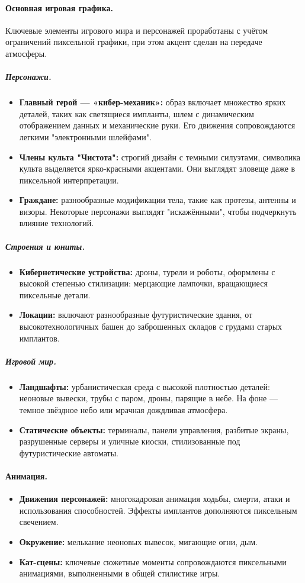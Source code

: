 \documentclass{article}
\begin{document}
\begin{itemize}
\paragraph{Основная игровая графика.}
Ключевые элементы игрового мира и персонажей проработаны с учётом ограничений пиксельной графики, при этом акцент сделан на передаче атмосферы.

\subparagraph{Персонажи.}
\begin{itemize}
    \item \textbf{Главный герой — «кибер-механик»:} образ включает множество ярких деталей, таких как светящиеся импланты, шлем с динамическим отображением данных и механические руки. Его движения сопровождаются легкими "электронными шлейфами".
    \item \textbf{Члены культа "Чистота":} строгий дизайн с темными силуэтами, символика культа выделяется ярко-красными акцентами. Они выглядят зловеще даже в пиксельной интерпретации.
    \item \textbf{Граждане:} разнообразные модификации тела, такие как протезы, антенны и визоры. Некоторые персонажи выглядят "искажёнными", чтобы подчеркнуть влияние технологий.
\end{itemize}

\subparagraph{Строения и юниты.}
\begin{itemize}
    \item \textbf{Кибернетические устройства:} дроны, турели и роботы, оформлены с высокой степенью стилизации: мерцающие лампочки, вращающиеся пиксельные детали.
    \item \textbf{Локации:} включают разнообразные футуристические здания, от высокотехнологичных башен до заброшенных складов с грудами старых имплантов.
\end{itemize}

\subparagraph{Игровой мир.}
\begin{itemize}
    \item \textbf{Ландшафты:} урбанистическая среда с высокой плотностью деталей: неоновые вывески, трубы с паром, дроны, парящие в небе. На фоне — темное звёздное небо или мрачная дождливая атмосфера.
    \item \textbf{Статические объекты:} терминалы, панели управления, разбитые экраны, разрушенные серверы и уличные киоски, стилизованные под футуристические автоматы.
\end{itemize}

\paragraph{Анимация.}
\begin{itemize}
    \item \textbf{Движения персонажей:} многокадровая анимация ходьбы, смерти, атаки и использования способностей. Эффекты имплантов дополняются пиксельным свечением.
    \item \textbf{Окружение:} мелькание неоновых вывесок, мигающие огни, дым.
    \item \textbf{Кат-сцены:} ключевые сюжетные моменты сопровождаются пиксельными анимациями, выполненными в общей стилистике игры.
\end{itemize}


\end{itemize}
\end{document}
